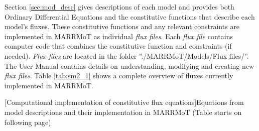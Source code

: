 Section \ref{sec:mod_desc} gives descriptions of each model and provides both Ordinary Differential Equations and the constitutive functions that describe each model's fluxes. These constitutive functions and any relevant constraints are implemented in MARRMoT as individual \emph{flux files}. Each \emph{flux file} contains computer code that combines the constitutive function and constraints (if needed). \emph{Flux files} are located in the folder ''./MARRMoT/Models/Flux files/''. The User Manual contains details on understanding, modifying and creating new \emph{flux files}. Table \ref{tab:sm2_1} shows a complete overview of fluxes currently implemented in MARRMoT.

\vfill{}
[Computational implementation of constitutive flux equations]{Equations from model descriptions and their implementation in MARRMoT (Table starts on following page) \label{tab:sm2_1}}



\clearpage
{}
\recalctypearea





% 


\clearpage
{}
\recalctypearea























